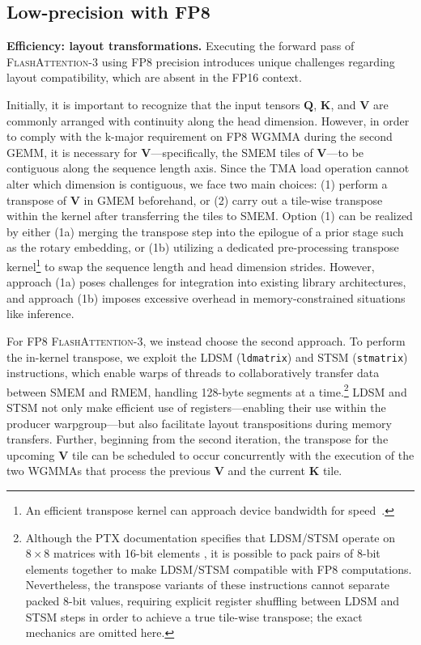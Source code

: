 \subsection{Low-precision with FP8}
\label{sec:algofp8}

\textbf{Efficiency: layout transformations.} Executing the forward pass of \textsc{FlashAttention-3} using FP8 precision introduces unique challenges regarding layout compatibility, which are absent in the FP16 context.

Initially, it is important to recognize that the input tensors $\mathbf{Q}$, $\mathbf{K}$, and $\mathbf{V}$ are commonly arranged with continuity along the head dimension. However, in order to comply with the k-major requirement on FP8 WGMMA during the second GEMM, it is necessary for $\mathbf{V}$—specifically, the SMEM tiles of $\mathbf{V}$—to be contiguous along the sequence length axis. Since the TMA load operation cannot alter which dimension is contiguous, we face two main choices: (1) perform a transpose of $\mathbf{V}$ in GMEM beforehand, or (2) carry out a tile-wise transpose within the kernel after transferring the tiles to SMEM. Option (1) can be realized by either (1a) merging the transpose step into the epilogue of a prior stage such as the rotary embedding, or (1b) utilizing a dedicated pre-processing transpose kernel\footnote{An efficient transpose kernel can approach device bandwidth for speed~\citep{colfax_cutlass_transpose_2024}.} to swap the sequence length and head dimension strides. However, approach (1a) poses challenges for integration into existing library architectures, and approach (1b) imposes excessive overhead in memory-constrained situations like inference.

For FP8 \textsc{FlashAttention-3}, we instead choose the second approach. To perform the in-kernel transpose, we exploit the LDSM (\verb|ldmatrix|) and STSM (\verb|stmatrix|) instructions, which enable warps of threads to collaboratively transfer data between SMEM and RMEM, handling 128-byte segments at a time.\footnote{Although the PTX documentation specifies that LDSM/STSM operate on $8 \times 8$ matrices with 16-bit elements \cite[\S 9.7.13.4.15-16]{ptx}, it is possible to pack pairs of 8-bit elements together to make LDSM/STSM compatible with FP8 computations. Nevertheless, the transpose variants of these instructions cannot separate packed 8-bit values, requiring explicit register shuffling between LDSM and STSM steps in order to achieve a true tile-wise transpose; the exact mechanics are omitted here.} LDSM and STSM not only make efficient use of registers—enabling their use within the producer warpgroup—but also facilitate layout transpositions during memory transfers. Further, beginning from the second iteration, the transpose for the upcoming $\mathbf{V}$ tile can be scheduled to occur concurrently with the execution of the two WGMMAs that process the previous $\mathbf{V}$ and the current $\mathbf{K}$ tile.

